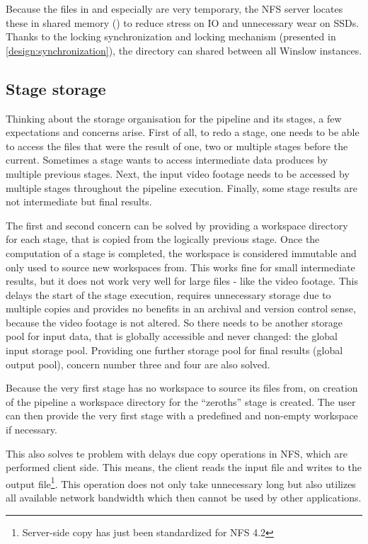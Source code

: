 Because the files in  and especially  are very temporary, the NFS server locates these in shared memory () to reduce stress on IO and unnecessary wear on SSDs.
Thanks to the locking synchronization and locking mechanism (presented in \autoref{design:synchronization}), the directory can shared between all Winslow instances.

\subsection{Stage storage}
\label{stage:workspace}


Thinking about the storage organisation for the pipeline and its stages, a few expectations and concerns arise.
First of all, to redo a stage, one needs to be able to access the files that were the result of one, two or multiple stages before the current.
Sometimes a stage wants to access intermediate data produces by multiple previous stages.
Next, the input video footage needs to be accessed by multiple stages throughout the pipeline execution.
Finally, some stage results are not intermediate but final results.

The first and second concern can be solved by providing a workspace directory for each stage, that is copied from the logically previous stage.
Once the computation of a stage is completed, the workspace is considered immutable and only used to source new workspaces from.
This works fine for small intermediate results, but it does not work very well for large files - like the video footage.
This delays the start of the stage execution, requires unnecessary storage due to multiple copies and provides no benefits in an archival and version control sense, because the video footage is not altered.
So there needs to be another storage pool for input data, that is globally accessible and never changed: the global input storage pool.
Providing one further storage pool for final results (global output pool), concern number three and four are also solved.

Because the very first stage has no workspace to source its files from, on creation of the pipeline a workspace directory for the \enquote{zeroths} stage is created.
The user can then provide the very first stage with a predefined and non-empty workspace if necessary.

This also solves te problem with delays due copy operations in NFS, which are performed client side.
This means, the client reads the input file and writes to the output file\footnote{Server-side copy has just been standardized for NFS 4.2\cite{nfs:ssc}}.
This operation does not only take unnecessary long but also utilizes all available network bandwidth which then cannot be used by other applications.

